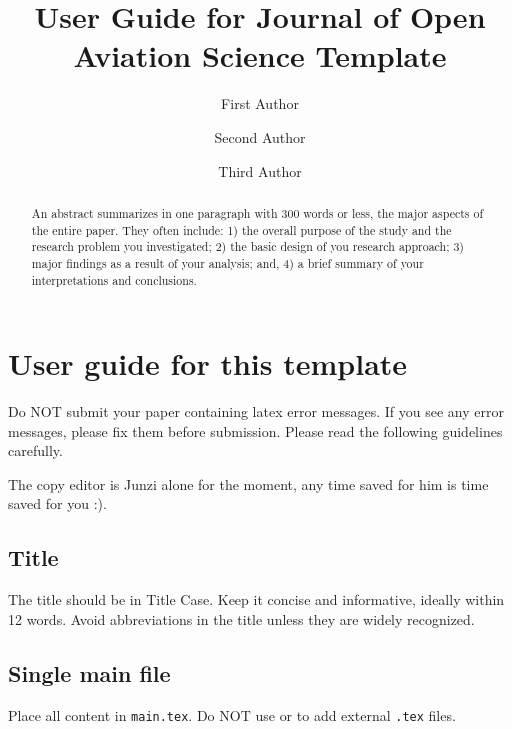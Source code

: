 \documentclass[
  manuscript=article,  %
  layout=preprint,  %
  year=20xx,
  volume=x,
]{extra/joas}
\title{User Guide for Journal of Open Aviation Science Template}
\author{First Author \orcid{0000-0000-0000-0000}}
\affiliation{Institution-1, City, Country}
\author{Second Author \orcid{0000-0000-0000-0000}}
\affiliation{Institution-2, City, Country}
\author{Third Author}
\affiliation{Institution-3, City, Country}
\begin{document}
\begin{abstract}
  An abstract summarizes in one paragraph with 300 words or less, the major aspects of the entire paper. They often include: 1) the overall purpose of the study and the research problem you investigated; 2) the basic design of you research approach; 3) major findings as a result of your analysis; and, 4) a brief summary of your interpretations and conclusions. 
\end{abstract}






\section{User guide for this template}

Do NOT submit your paper containing latex error messages. If you see any error messages, please fix them before submission. Please read the following guidelines carefully.

The copy editor is Junzi alone for the moment, any time saved for him is time saved for you :).

\subsection{Title}
The title should be in Title Case. Keep it concise and informative, ideally within 12 words. Avoid abbreviations in the title unless they are widely recognized.

\subsection{Single main file}
Place all content in \texttt{main.tex}. Do NOT use \verb|| or \verb|| to add external \verb|.tex| files.
\end{document}
